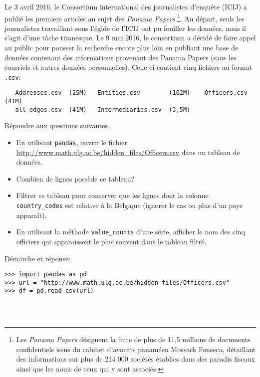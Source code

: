 \begin{question}[2 pts]
    Le 3 avril 2016, le Consortium international des journalistes d'enquête
    (ICIJ) a publié les premiers articles au sujet des \emph{Panama Papers}
    \footnote{Les \emph{Panama Papers} désignent la fuite de plus de 11,5
	millions de documents confidentiels issus du cabinet d'avocats
	panaméen Mossack Fonseca, détaillant des informations sur plus de 214
	000 sociétés établies dans des paradis fiscaux
    ainsi que les noms de ceux qui y sont associés.}.
    Au départ, seuls les journalistes travaillant sous l'égide de
    l'ICIJ ont pu fouiller les données, mais il s’agit d’une tâche titanesque.
    Le 9 mai 2016, le consortium a décidé de faire appel au public pour
    pousser la recherche encore plus loin en publiant une base de données
    contenant des informations provenant des Panama Papers (sans les
    courriels et autres données personnelles).
Celle-ci contient cinq fichiers au format \texttt{.csv}:
\begin{verbatim}
   Addresses.csv  (25M)   Entities.csv        (102M)    Officers.csv  (41M) 
   all_edges.csv  (41M)   Intermediaries.csv  (3,5M)
\end{verbatim}
\vspace{-6pt}
    Répondre aux questions suivantes.
    \begin{itemize}
	\item En utilisant \texttt{pandas}, ouvrir le fichier
	    \url{http://www.math.ulg.ac.be/hidden_files/Officers.csv} dans un
	    tableau de données.
	\item Combien de lignes possède ce tableau?
	\item Filtrer ce tableau pour conserver que les lignes dont la
	    colonne \texttt{country\_codes} est relative à la Belgique
	    (ignorer le cas ou plus d'un pays apparaît).
	\item En utilisant la méthode \texttt{value\_counts} d'une série,
	      afficher le nom des cinq officiers qui apparaissent le plus
              souvent dans le tableau filtré.
    \end{itemize}
\begin{mybox}
Démarche et réponse:
\begin{reponse}
\begin{verbatim}
>>> import pandas as pd
>>> url = "http://www.math.ulg.ac.be/hidden_files/Officers.csv"
>>> df = pd.read_csv(url)




\end{verbatim}
\end{reponse}
\end{mybox}
\end{question}
